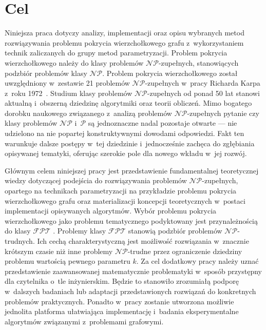 \section{Cel}\label{Section_Aim}
\par{
  Niniejsza praca dotyczy analizy, implementacji oraz opisu wybranych metod rozwiązywania problemu pokrycia wierzchołkowego grafu z~wykorzystaniem technik zaliczanych do grupy metod parametryzacji.
  Problem pokrycia wierzchołkowego należy do klasy problemów $\mathcal{NP}$-zupełnych, stanowiących podzbiór problemów klasy $\mathcal{NP}$.
  Problem pokrycia wierzchołkowego został uwzględniony w~zestawie 21 problemów $\mathcal{NP}$-zupełnych w~pracy Richarda Karpa z~roku 1972~\cite{DBLP:Karp10}.
  Studium klasy problemów $\mathcal{NP}$-zupełnych od ponad 50 lat stanowi aktualną i~obszerną dziedzinę algorytmiki oraz teorii obliczeń.
  Mimo bogatego dorobku naukowego związanego z~analizą problemów $\mathcal{NP}$-zupełnych pytanie czy klasy problemów $\mathcal{NP}$ i~$\mathcal{P}$ są jednoznaczne nadal pozostaje otwarte --- nie udzielono na nie popartej konstruktywnymi dowodami odpowiedzi.
  Fakt ten warunkuje dalsze postępy w~tej dziedzinie i~jednocześnie zachęca do zgłębiania opisywanej tematyki, oferując szerokie pole dla nowego wkładu w~jej rozwój.
}
\par{
  Głównym celem niniejszej pracy jest przedstawienie fundamentalnej teoretycznej wiedzy dotyczącej podejścia do rozwiązywania problemów $\mathcal{NP}$-zupełnych, opartego na technikach parametryzacji na przykładzie problemu pokrycia wierzchołkowego grafu oraz materializacji koncepcji teoretycznych w~postaci implementacji opisywanych algorytmów.
  Wybór problemu pokrycia wierzchołkowego jako problemu tematycznego podyktowany jest przynależnością do klasy $\mathcal{FPT}$ .
  Problemy klasy $\mathcal{FPT}$ stanowią podzbiór problemów $\mathcal{NP}$-trudnych.
  Ich cechą charakterystyczną jest możliwość rozwiązania w~znacznie krótszym czasie niż inne problemy $\mathcal{NP}$-trudne przez ograniczenie dziedziny problemu wartością pewnego parametru $k$.
  Za cel dodatkowy pracy należy uznać przedstawienie zaawansowanej matematycznie problematyki w~sposób przystępny dla czytelnika o~tle inżynierskim.
  Będzie to stanowiło zrozumiałą podporę w~dalszych badaniach lub adaptacji przedstawionych rozwiązań do konkretnych problemów praktycznych.
  Ponadto w~pracy zostanie utworzona możliwie jednolita platforma ułatwiająca implementację i~badania eksperymentalne algorytmów związanymi z~problemami grafowymi.
}
